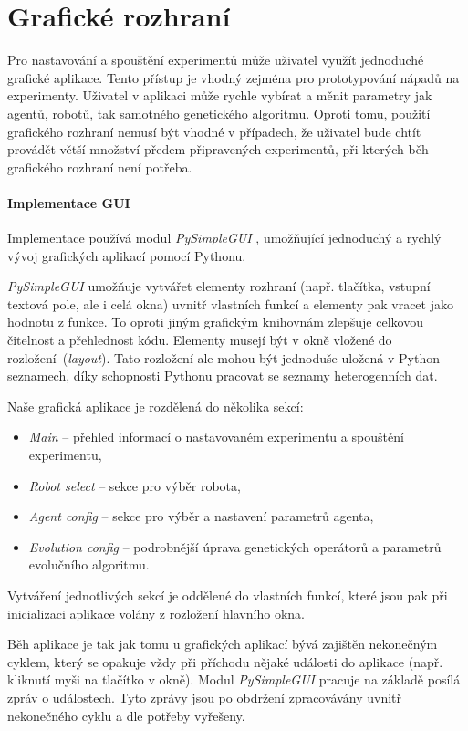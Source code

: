 \section{Grafické rozhraní} \label{imp:GUI}
Pro nastavování a spouštění experimentů může uživatel využít jednoduché
grafické aplikace. Tento přístup je vhodný zejména pro prototypování nápadů na
experimenty. Uživatel v aplikaci může rychle vybírat a měnit parametry jak
agentů, robotů, tak samotného genetického algoritmu. Oproti tomu, použití
grafického rozhraní nemusí být vhodné v případech, že uživatel bude chtít
provádět větší množství předem připravených experimentů, při kterých běh
grafického rozhraní není potřeba.

\paragraph{Implementace GUI}
Implementace používá modul \emph{PySimpleGUI} \citep{pysimplegui}, umožňující
jednoduchý a rychlý vývoj grafických aplikací pomocí Pythonu. 

\emph{PySimpleGUI} umožňuje vytvářet elementy rozhraní (např.
tlačítka, vstupní textová pole, ale i celá okna) uvnitř vlastních funkcí a
elementy pak vracet jako hodnotu z funkce. To oproti jiným grafickým knihovnám
zlepšuje celkovou čitelnost a přehlednost kódu. Elementy musejí být v okně
vložené do rozložení~(\emph{layout}). Tato rozložení ale mohou být jednoduše
uložená v Python seznamech, díky schopnosti Pythonu pracovat se seznamy
heterogenních dat.

Naše grafická aplikace je rozdělená do několika sekcí:

\begin{itemize}
    \item \emph{Main} -- přehled informací o nastavovaném experimentu a
        spouštění experimentu,
    \item \emph{Robot select} -- sekce pro výběr robota,
    \item \emph{Agent config} -- sekce pro výběr a nastavení parametrů agenta,
    \item \emph{Evolution config} -- podrobnější úprava genetických operátorů a
        parametrů evolučního algoritmu.
\end{itemize}

Vytváření jednotlivých sekcí je oddělené do vlastních funkcí, které jsou pak
při inicializaci aplikace volány z rozložení hlavního okna.

Běh aplikace je tak jak tomu u grafických aplikací bývá zajištěn nekonečným
cyklem, který se opakuje vždy při příchodu nějaké události do aplikace (např.
kliknutí myši na tlačítko v okně). Modul \emph{PySimpleGUI} pracuje na základě
posílá zpráv o událostech. Tyto zprávy jsou po obdržení zpracovávány uvnitř
nekonečného cyklu a dle potřeby vyřešeny.

